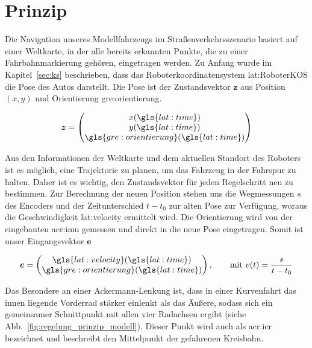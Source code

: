 \section{Prinzip}

Die Navigation unseres Modellfahrzeugs im Straßenverkehrsszenario basiert auf einer Weltkarte, in der alle bereits erkannten Punkte, die zu einer Fahrbahnmarkierung gehören, eingetragen werden. Zu Anfang wurde im Kapitel~\ref{sec:ks} beschrieben, dass das Roboterkoordinatensystem \gls{lat:RoboterKOS} die Pose des Autos darstellt. Die Pose ist der Zustandsvektor \( \boldsymbol{z} \) aus Position \( (x,y) \) und Orientierung \gls{gre:orientierung}.

\begin{equation}
\boldsymbol{z} = 
\begin{pmatrix}
x(\gls{lat:time}) 	\\
y(\gls{lat:time})	\\
\gls{gre:orientierung}(\gls{lat:time})    	\\
\end{pmatrix}
\end{equation} 

 Aus den Informationen der Weltkarte und dem aktuellen Standort des Roboters ist es möglich, eine Trajektorie zu planen, um das Fahrzeug in der Fahrspur zu halten. Daher ist es wichtig, den Zustandsvektor für jeden Regelschritt neu zu bestimmen. Zur Berechnung der neuen Position stehen uns die Wegmessungen \(s\) des Encoders und der Zeitunterschied \(t-t_0\) zur alten Pose zur Verfügung, woraus die Geschwindigkeit \gls{lat:velocity} ermittelt wird. Die Orientierung wird von der eingebauten \gls{acr:imu} gemessen und direkt in die neue Pose eingetragen. Somit ist unser Eingangsvektor \(\boldsymbol{e}\)
 
\begin{equation}
\boldsymbol{e} = 
\begin{pmatrix}
\gls{lat:velocity}(\gls{lat:time}) 			\\
\gls{gre:orientierung}(\gls{lat:time})    	\\
\end{pmatrix}
, \qquad \text{mit }
v(t) = \frac{s}{t-t_0}
\end{equation} 
 
Das Besondere an einer Ackermann-Lenkung ist, dass in einer Kurvenfahrt das innen liegende Vorderrad stärker einlenkt als das Äußere, sodass sich ein gemeinsamer Schnittpunkt mit allen vier Radachsen ergibt (siehe Abb.~\ref{fig:regelung_prinzip_modell}). Dieser Punkt wird auch als \gls{acr:icr} bezeichnet und beschreibt den Mittelpunkt der gefahrenen Kreisbahn. 

